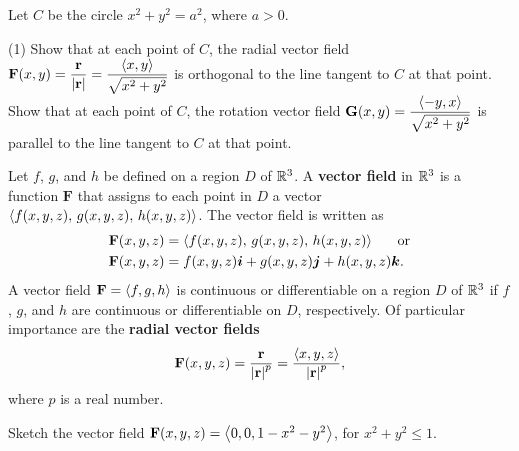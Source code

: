 \documentclass[mathNotesPreamble]{subfiles}
\begin{document}
  \begin{ex*}
    Let $C$ be the circle $x^2+y^2=a^2$, where $a>0$.
  \end{ex*}
  \begin{tasks}[after-item-skip=\stretch{1}, label=\alph*)](1)
    \task 
      Show that at each point of $C$, the radial vector field $\displaystyle\mathbf F(x,y)=\frac{{\mathbf{r}}}{{\left\vert{\mathbf{r}}\right\vert}}=\frac{{\left\langle x,y \right\rangle}}{\sqrt{x^2+y^2}}$ is orthogonal to the line tangent to $C$ at that point.
    \task 
      Show that at each point of $C$, the rotation vector field $\displaystyle\mathbf G(x,y)=\frac{{\left\langle -y,x \right\rangle}}{\sqrt{x^2+y^2}}$ is parallel to the line tangent to $C$ at that point.
  \end{tasks}
  \pagebreak

  \begin{defn*}
    Let $f$, $g$, and $h$ be defined on a region $D$ of $\mathbb{R}^3$. A \textbf{vector field} in $\mathbb{R}^3$ is a function $\mathbf F$ that assigns to each point in $D$ a vector ${\left\langle f(x,y,z),\,g(x,y,z),\,h(x,y,z) \right\rangle}$. The vector field is written as
      \begin{align*}
        \mathbf F(x,y,z)&= {\left\langle f(x,y,z),\,g(x,y,z),\,h(x,y,z) \right\rangle}\hspace*{15pt} \textnormal{ or}\\
        \mathbf F(x,y,z)&= f(x,y,z){\bm{i}}+g(x,y,z){\bm{j}}+h(x,y,z){\bm{k}}.
      \end{align*}
    A vector field $\mathbf F={\left\langle f,g,h \right\rangle}$ is continuous or differentiable on a region $D$ of $\mathbb{R}^3$ if $f$, $g$, and $h$ are continuous or differentiable on $D$, respectively. Of particular importance are the \textbf{radial vector fields}
      \[\mathbf F(x,y,z)=\frac{{\mathbf{r}}}{{\left\vert{\mathbf{r}}\right\vert}^p}=\frac{{\left\langle x,y,z \right\rangle}}{{\left\vert{\mathbf{r}}\right\vert}^p},\]
    where $p$ is a real number.
  \end{defn*}
  \begin{ex*}
    Sketch the vector field $\mathbf F(x,y,z)={\left\langle 0,0,1-x^2-y^2 \right\rangle}$, for $x^2+y^2\leq 1$.
  \end{ex*}
  \begin{center}
  \end{center}
\end{document}
